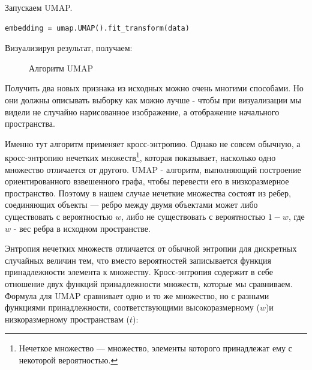 Запускаем UMAP.
\begin{verbatim}
embedding = umap.UMAP().fit_transform(data)
\end{verbatim}

Визуализируя результат, получаем:

\begin{figure}[bh]
	\noindent{}
	\caption{Алгоритм UMAP}
	\label{figCurves}
\end{figure} 

Получить два новых признака из исходных можно очень многими способами. Но они должны описывать выборку как можно лучше - чтобы при визуализации мы видели не случайно нарисованное изображение, а отображение начального пространства. 

Именно тут алгоритм применяет кросс-энтропию. Однако не совсем обычную, а кросс-энтропию нечетких множеств\footnote{Нечеткое множество --- множество, элементы которого принадлежат ему с некоторой вероятностью.}, которая показывает, насколько одно множество отличается от другого. UMAP - алгоритм, выполняющий построение ориентированного взвешенного графа, чтобы перевести его в низкоразмерное пространство. Поэтому в нашем случае нечеткие множества состоят из ребер, соединяющих объекты --- ребро между двумя объектами может либо существовать с вероятностью $w$, либо не существовать с вероятностью $1-w$, где $w$ - вес ребра в исходном пространстве.

Энтропия нечетких множеств отличается от обычной энтропии для дискретных случайных величин тем, что вместо вероятностей записывается функция принадлежности элемента к множеству. Кросс-энтропия содержит в себе отношение двух функций принадлежности множеств, которые мы сравниваем. Формула для UMAP сравнивает одно и то же множество, но с разными функциями принадлежности, соответствующими высокоразмерному ($w$)и низкоразмерному пространствам ($t$):


